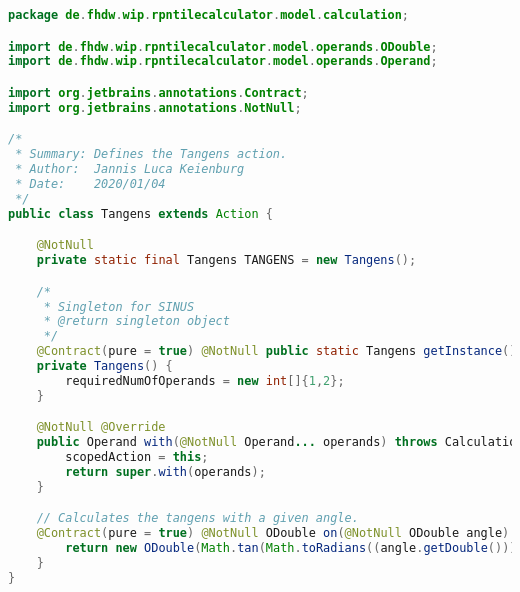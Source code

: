 \begin{lstlisting}[caption=Tangens (Keienburg),label=list:Tangens,language=Java]
package de.fhdw.wip.rpntilecalculator.model.calculation;

import de.fhdw.wip.rpntilecalculator.model.operands.ODouble;
import de.fhdw.wip.rpntilecalculator.model.operands.Operand;

import org.jetbrains.annotations.Contract;
import org.jetbrains.annotations.NotNull;

/*
 * Summary: Defines the Tangens action.
 * Author:  Jannis Luca Keienburg
 * Date:    2020/01/04
 */
public class Tangens extends Action {

    @NotNull
    private static final Tangens TANGENS = new Tangens();

    /*
     * Singleton for SINUS
     * @return singleton object
     */
    @Contract(pure = true) @NotNull public static Tangens getInstance() { return TANGENS; }
    private Tangens() {
        requiredNumOfOperands = new int[]{1,2};
    }

    @NotNull @Override
    public Operand with(@NotNull Operand... operands) throws CalculationException {
        scopedAction = this;
        return super.with(operands);
    }

    // Calculates the tangens with a given angle.
    @Contract(pure = true) @NotNull ODouble on(@NotNull ODouble angle) {
        return new ODouble(Math.tan(Math.toRadians((angle.getDouble()))));
    }
}
\end{lstlisting}    

